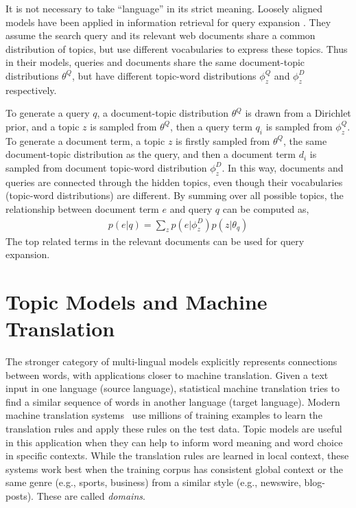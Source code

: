 It is not necessary to take ``language'' in its strict meaning.
Loosely aligned models have been applied in information retrieval for query expansion \citep{Gao-2011,Gao-2012}. They assume the search
query and its relevant web documents share a common distribution of
topics, but use different vocabularies to express these topics. Thus
in their models, queries and documents share the same document-topic
distributions $\theta^Q$, but have different topic-word distributions
$\phi_z^Q$ and $\phi_z^D$ respectively.

To generate a query $q$, a document-topic distribution $\theta^Q$ is
drawn from a Dirichlet prior, and a topic $z$ is sampled from
$\theta^Q$, then a query term $q_i$ is sampled from $\phi_z^Q$. To
generate a document term, a topic $z$ is firstly sampled from
$\theta^Q$, the same document-topic distribution as the query, and
then a document term $d_i$ is sampled from document topic-word
distribution $\phi_z^D$. In this way, documents and queries are
connected through the hidden topics, even though their vocabularies
(topic-word distributions) are different. By summing over all possible
topics, the relationship between document term $e$ and query $q$ can
be computed as,
\begin{align}
p(e|q) = \sum_z p(e|\phi_z^D) p(z | \theta_q)
\end{align}
The top related terms in the relevant documents can be used for query expansion. 

\section{Topic Models and Machine Translation}

The stronger category of multi-lingual models explicitly represents connections between words, with applications closer to machine translation.
Given a text input in one language (source language), statistical
machine translation tries to find a similar sequence of words in another
language (target language). Modern machine translation
systems~\citep{koehn-09} use millions of training examples to learn
the translation rules and apply these rules on the test data. 
Topic models are useful in this application when they can help to inform word meaning and word choice in specific contexts.
While the translation rules are learned in local context, these systems work
best when the training corpus has consistent global context or the
same genre (e.g., sports, business) from a similar style (e.g.,
newswire, blog-posts).  These are called \emph{domains}.


